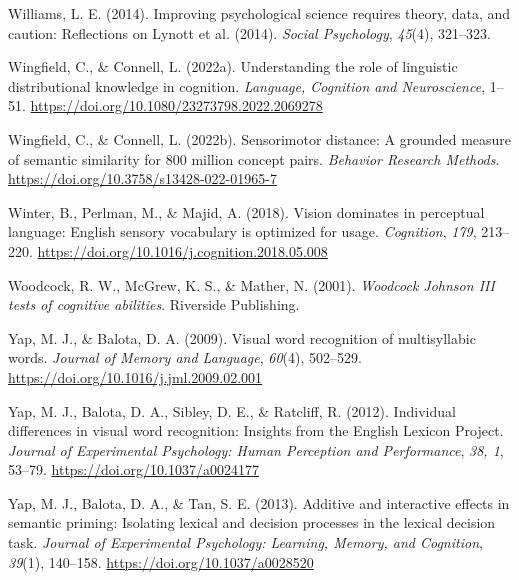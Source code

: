\documentclass[
  12pt,
  man,floatsintext]{apa7}
\newlength{\cslhangindent}
\newlength{\cslentryspacingunit} %
\newenvironment{CSLReferences}[2] %
 {%
  \setlength{\parindent}{0pt}
  \ifodd #1
  \let\oldpar\par
  \def\par{\hangindent=\cslhangindent\oldpar}
  \fi
  \setlength{\parskip}{#2\cslentryspacingunit}
 }%
 {}
\begin{document}
\begin{CSLReferences}{1}{0}
\leavevmode{}%
Williams, L. E. (2014). Improving psychological science requires theory, data, and caution: {Reflections} on {Lynott} et al. (2014). \emph{Social Psychology}, \emph{45}(4), 321--323.

\leavevmode{}%
Wingfield, C., \& Connell, L. (2022a). Understanding the role of linguistic distributional knowledge in cognition. \emph{Language, Cognition and Neuroscience}, 1--51. \url{https://doi.org/10.1080/23273798.2022.2069278}

\leavevmode{}%
Wingfield, C., \& Connell, L. (2022b). Sensorimotor distance: {A} grounded measure of semantic similarity for 800 million concept pairs. \emph{Behavior Research Methods}. \url{https://doi.org/10.3758/s13428-022-01965-7}

\leavevmode{}%
Winter, B., Perlman, M., \& Majid, A. (2018). Vision dominates in perceptual language: {English} sensory vocabulary is optimized for usage. \emph{Cognition}, \emph{179}, 213--220. \url{https://doi.org/10.1016/j.cognition.2018.05.008}

\leavevmode{}%
Woodcock, R. W., McGrew, K. S., \& Mather, N. (2001). \emph{Woodcock {Johnson III} tests of cognitive abilities}. {Riverside Publishing}.

\leavevmode{}%
Yap, M. J., \& Balota, D. A. (2009). Visual word recognition of multisyllabic words. \emph{Journal of Memory and Language}, \emph{60}(4), 502--529. \url{https://doi.org/10.1016/j.jml.2009.02.001}

\leavevmode{}%
Yap, M. J., Balota, D. A., Sibley, D. E., \& Ratcliff, R. (2012). Individual differences in visual word recognition: {Insights} from the {English Lexicon Project}. \emph{Journal of Experimental Psychology: Human Perception and Performance}, \emph{38, 1}, 53--79. \url{https://doi.org/10.1037/a0024177}

\leavevmode{}%
Yap, M. J., Balota, D. A., \& Tan, S. E. (2013). Additive and interactive effects in semantic priming: {Isolating} lexical and decision processes in the lexical decision task. \emph{Journal of Experimental Psychology: Learning, Memory, and Cognition}, \emph{39}(1), 140--158. \url{https://doi.org/10.1037/a0028520}


\end{CSLReferences}
\end{document}
